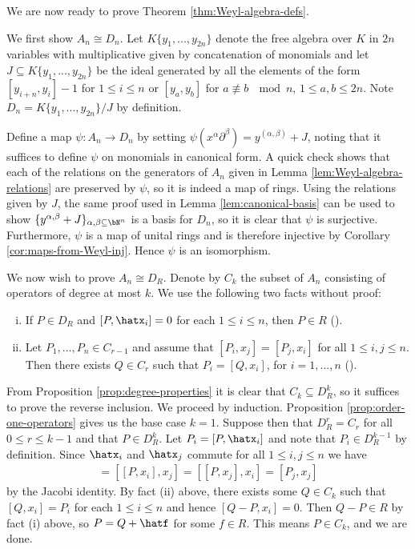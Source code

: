 \bigskip

\noindent We are now ready to prove Theorem \ref{thm:Weyl-algebra-defs}.
\begin{prf}
	We first show $A_n \cong D_n$. Let $K\{y_1,...,y_{2n}\}$ denote the free algebra over $K$ in $2n$ variables with multiplicative given by concatenation of monomials and let $J\subseteq K\{y_1,...,y_{2n}\}$ be the ideal generated by all the elements of the form $[y_{i+n},y_{i}] - 1$ for $1\leq i\leq n$ or $[y_a,y_b]$ for $a \not\equiv b ~ \mod n$, $1\leq a,b\leq 2n$. Note $D_n = K\{y_1,...,y_{2n}\}/J$ by definition. 

	Define a map $\psi: A_n\to D_n$ by setting $\psi(x^\alpha\partial^\beta) = y^{(\alpha,\beta)} + J$, noting that it suffices to define $\psi$ on monomials in canonical form. A quick check shows that each of the relations on the generators of $A_n$ given in Lemma \ref{lem:Weyl-algebra-relations} are preserved by $\psi$, so it is indeed a map of rings. Using the relations given by $J$, the same proof used in Lemma \ref{lem:canonical-basis} can be used to show $\{y^{\alpha,\beta} + J\}_{\alpha,\beta \subseteq \bN^n}$ is a basis for $D_n$, so it is clear that $\psi$ is surjective. Furthermore, $\psi$ is a map of unital rings and is therefore injective by Corollary \ref{cor:maps-from-Weyl-inj}. Hence $\psi$ is an isomorphism.

	We now wish to prove $A_n \cong D_{R}$. Denote by $C_k$ the subset of $A_n$ consisting of operators of degree at most $k$. We use the following two facts without proof:
	\begin{enumerate}[(i)]
		\item If $P \in D_{R}$ and $[P,\hatx_i] = 0$ for each $1\leq i\leq n$, then $P \in R$ \hspace{1em} (\cite[Lemma 3.2.1]{d-mod-primer}).
		\item Let $P_1,...,P_n \in C_{r-1}$ and assume that $[P_i,x_j] = [P_j,x_i]$ for all $1\leq i,j\leq n$. Then there exists $Q \in C_r$ such that $P_i = [Q,x_i]$, for $i=1,...,n$ \hspace{1em} (\cite[Lemma 3.2.2]{d-mod-primer}).
	\end{enumerate}
	From  Proposition \ref{prop:degree-properties} it is clear that $C_k \subseteq D^k_{R}$, so it suffices to prove the reverse inclusion. We proceed by induction. Proposition \ref{prop:order-one-operators} gives us the base case $k = 1$. Suppose then that $D^r_{R} = C_r$ for all $0\leq r \leq k - 1$ and that $P \in D^k_{R}$. Let $P_i = [P,\hatx_i]$ and note that $P_i \in D^{k-1}_{R}$ by definition. Since $\hatx_i$ and $\hatx_j$ commute for all $1\leq i,j \leq n$ we have
	\begin{align*}
		[P_i,x_j] = [[P,x_i],x_j] = [[P,x_j],x_i] = [P_j,x_j]
	\end{align*}
	by the Jacobi identity. By fact (ii) above, there exists some $Q \in C_k$ such that $[Q,x_i] = P_i$ for each $1\leq i\leq n$ and hence $[Q - P,x_i] = 0$. Then $Q - P \in R$ by fact (i) above, so $P = Q + \hatf$ for some $f \in R$. This means $P \in C_k$, and we are done.
\end{prf}

